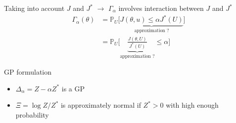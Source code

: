 \documentclass[10pt,aspectratio=169,usepdftitle=false]{beamer}
\newcommand{\GP}{\mathsf{GP}}
\newcommand{\Prob}{\mathbb{P}}
\newcommand{\kk}{\theta}
\newcommand{\uu}{u}
\newcommand{\UU}{U}
\begin{document}
\begin{frame}{Taking into account $J$ and $J^*$}
   $\rightarrow$ $\Gamma_{\alpha}$ involves interaction between $J$ and $J^*$
  \begin{align}
    \Gamma_{\alpha}(\kk)&= \Prob_{\UU}\big[\underbrace{J(\kk, \uu) \leq \alpha J^*(\UU)}_{\text{approximation ?}} \big] \\
                        &= \Prob_{\UU}\bigg[ \underbrace{\frac{J(\kk, \UU)}{J^*(\UU)}}_{\text{approximation ?}} \leq \alpha\bigg]
  \end{align}
  \begin{block}{GP formulation}
    \begin{itemize}
  \item $\Delta_{\alpha} = Z - \alpha Z^*$ is a GP
\item $\Xi = \log Z/Z^*$ is approximately normal if $Z^* > 0$ with high enough probability
\end{itemize}
\end{block}
\end{frame}
\end{document}

